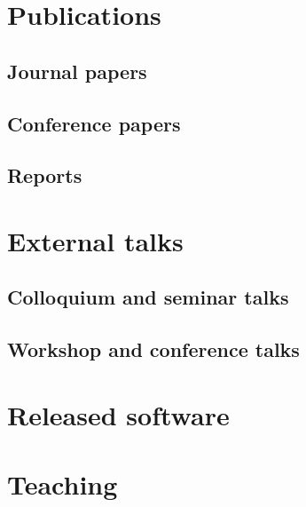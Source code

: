 \documentclass{article}
\begin{document}

\section*{Publications}

\subsection*{Journal papers}



\subsection*{Conference papers}



\subsection*{Reports}




\section*{External talks}

\subsection*{Colloquium and seminar talks}



\subsection*{Workshop and conference talks}




\section*{Released software}



\section*{Teaching}
\end{document}
